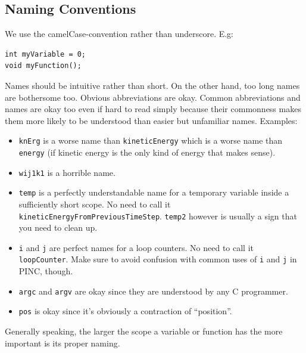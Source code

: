 \documentclass[10pt,a4paper]{article}
\begin{document}
\subsection{Naming Conventions}
We use the camelCase-convention rather than underscore. E.g:
\begin{lstlisting}
int myVariable = 0;
void myFunction();
\end{lstlisting}
Names should be intuitive rather than short. On the other hand, too long names are bothersome too. Obvious abbreviations are okay. Common abbreviations and names are okay too even if hard to read simply because their commonness makes them more likely to be understood than easier but unfamiliar names. Examples:
	\begin{itemize}
		\item \lstinline$knErg$ is a worse name than \lstinline$kineticEnergy$ which is a worse name than \lstinline$energy$ (if kinetic energy is the only kind of energy that makes sense).
		\item \lstinline$wij1k1$ is a horrible name.
		\item \lstinline$temp$ is a perfectly understandable name for a temporary variable inside a sufficiently short scope. No need to call it \lstinline$kineticEnergyFromPreviousTimeStep$. \lstinline$temp2$ however is usually a sign that you need to clean up.
		\item \lstinline$i$ and \lstinline$j$ are perfect names for a loop counters. No need to call it \lstinline$loopCounter$. Make sure to avoid confusion with common uses of \lstinline$i$ and \lstinline$j$ in PINC, though.
		\item \lstinline$argc$ and \lstinline$argv$ are okay since they are understood by any C programmer.
		\item \lstinline$pos$ is okay since it's obviously a contraction of ``position''.
	\end{itemize}
Generally speaking, the larger the scope a variable or function has the more important is its proper naming.
\end{document}
